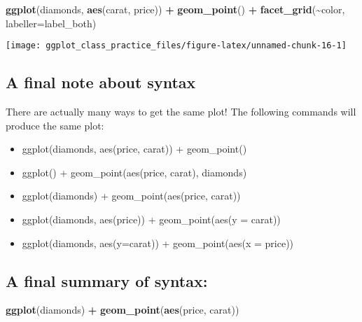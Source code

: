 \documentclass[
]{article}
\newenvironment{Shaded}{\begin{snugshade}}{\end{snugshade}}
\newcommand{\AttributeTok}[1]{\textcolor[rgb]{0.13,0.29,0.53}{#1}}
\newcommand{\FunctionTok}[1]{\textcolor[rgb]{0.13,0.29,0.53}{\textbf{#1}}}
\newcommand{\NormalTok}[1]{#1}
\newcommand{\SpecialCharTok}[1]{\textcolor[rgb]{0.81,0.36,0.00}{\textbf{#1}}}
\providecommand{\tightlist}{%
  \setlength{\itemsep}{0pt}\setlength{\parskip}{0pt}}
\begin{document}
\begin{Shaded}
\begin{Highlighting}[]
\FunctionTok{ggplot}\NormalTok{(diamonds, }\FunctionTok{aes}\NormalTok{(carat, price)) }\SpecialCharTok{+} \FunctionTok{geom\_point}\NormalTok{() }\SpecialCharTok{+}
 \FunctionTok{facet\_grid}\NormalTok{(}\SpecialCharTok{\textasciitilde{}}\NormalTok{color, }\AttributeTok{labeller=}\NormalTok{label\_both)}
\end{Highlighting}
\end{Shaded}

\begin{center}\texttt{[image: ggplot\_class\_practice\_files/figure-latex/unnamed-chunk-16-1]} \end{center}

\hypertarget{a-final-note-about-syntax}{%
\subsection{A final note about syntax}\label{a-final-note-about-syntax}}

There are actually many ways to get the same plot! The following
commands will produce the same plot:

\begin{itemize}
\tightlist
\item
  ggplot(diamonds, aes(price, carat)) + geom\_point()
\item
  ggplot() + geom\_point(aes(price, carat), diamonds)
\item
  ggplot(diamonds) + geom\_point(aes(price, carat))
\item
  ggplot(diamonds, aes(price)) + geom\_point(aes(y = carat))
\item
  ggplot(diamonds, aes(y=carat)) + geom\_point(aes(x = price))
\end{itemize}

\hypertarget{a-final-summary-of-syntax}{%
\subsection{A final summary of
syntax:}\label{a-final-summary-of-syntax}}

\begin{Shaded}
\begin{Highlighting}[]
\FunctionTok{ggplot}\NormalTok{(diamonds) }\SpecialCharTok{+} \FunctionTok{geom\_point}\NormalTok{(}\FunctionTok{aes}\NormalTok{(price, carat))}
\end{Highlighting}
\end{Shaded}
\end{document}
